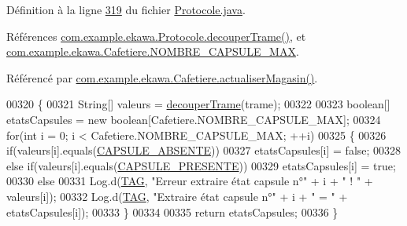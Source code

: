 Définition à la ligne \hyperlink{_protocole_8java_source_l00319}{319} du fichier \hyperlink{_protocole_8java_source}{Protocole.\+java}.



Références \hyperlink{_protocole_8java_source_l00208}{com.\+example.\+ekawa.\+Protocole.\+decouper\+Trame()}, et \hyperlink{_cafetiere_8java_source_l00029}{com.\+example.\+ekawa.\+Cafetiere.\+N\+O\+M\+B\+R\+E\+\_\+\+C\+A\+P\+S\+U\+L\+E\+\_\+\+M\+AX}.



Référencé par \hyperlink{_cafetiere_8java_source_l00561}{com.\+example.\+ekawa.\+Cafetiere.\+actualiser\+Magasin()}.


\begin{DoxyCode}
00320     \{
00321         String[] valeurs = \hyperlink{classcom_1_1example_1_1ekawa_1_1_protocole_a23c261e4ab5ad3c2ac60187f04ae40ea}{decouperTrame}(trame);
00322 
00323         \textcolor{keywordtype}{boolean}[] etatsCapsules = \textcolor{keyword}{new} \textcolor{keywordtype}{boolean}[Cafetiere.NOMBRE\_CAPSULE\_MAX];
00324         \textcolor{keywordflow}{for}(\textcolor{keywordtype}{int} i = 0; i < Cafetiere.NOMBRE\_CAPSULE\_MAX; ++i)
00325         \{
00326             \textcolor{keywordflow}{if}(valeurs[i].equals(\hyperlink{classcom_1_1example_1_1ekawa_1_1_protocole_ac7b6a2008b1195eae4628de3326bf97f}{CAPSULE\_ABSENTE}))
00327                 etatsCapsules[i] = \textcolor{keyword}{false};
00328             \textcolor{keywordflow}{else} \textcolor{keywordflow}{if}(valeurs[i].equals(\hyperlink{classcom_1_1example_1_1ekawa_1_1_protocole_a4cd76f0386b4691063c48c0e4d8d8e40}{CAPSULE\_PRESENTE}))
00329                 etatsCapsules[i] = \textcolor{keyword}{true};
00330             \textcolor{keywordflow}{else}
00331                 Log.d(\hyperlink{classcom_1_1example_1_1ekawa_1_1_protocole_ae9b68fa0daac528421b887f19413f8f5}{TAG}, \textcolor{stringliteral}{"Erreur extraire état capsule n°"} + i + \textcolor{stringliteral}{" ! "} + valeurs[i]);
00332             Log.d(\hyperlink{classcom_1_1example_1_1ekawa_1_1_protocole_ae9b68fa0daac528421b887f19413f8f5}{TAG}, \textcolor{stringliteral}{"Extraire état capsule n°"} + i + \textcolor{stringliteral}{" = "} + etatsCapsules[i]);
00333         \}
00334 
00335         \textcolor{keywordflow}{return} etatsCapsules;
00336     \}
\end{DoxyCode}
\mbox{\label{classcom_1_1example_1_1ekawa_1_1_protocole_ae5e80461f082b4d2e469ee6841b9a380}} 
